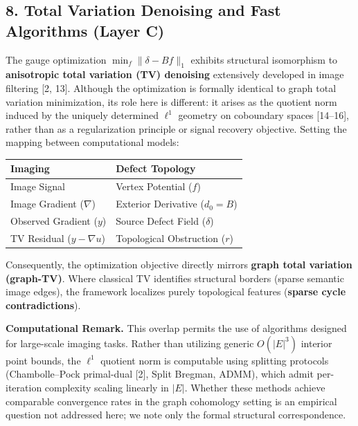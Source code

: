 \documentclass[
]{article}
\begin{document}
\subsection{\texorpdfstring{8. Total Variation Denoising and Fast
Algorithms \textbf{(Layer
C)}}{8. Total Variation Denoising and Fast Algorithms (Layer C)}}\label{total-variation-denoising-and-fast-algorithms-layer-c}

The gauge optimization \(\min_f \|\delta - B f\|_1\) exhibits structural
isomorphism to \textbf{anisotropic total variation (TV) denoising}
extensively developed in image filtering {[}2, 13{]}. Although the
optimization is formally identical to graph total variation
minimization, its role here is different: it arises as the quotient norm
induced by the uniquely determined \(\ell^1\) geometry on coboundary
spaces {[}14--16{]}, rather than as a regularization principle or signal
recovery objective. Setting the mapping between computational models:

\begin{longtable}[]{@{}ll@{}}
\toprule\noalign{}
Imaging & Defect Topology \\
\midrule\noalign{}
\endhead
\bottomrule\noalign{}
\endlastfoot
Image Signal & Vertex Potential (\(f\)) \\
Image Gradient (\(\nabla\)) & Exterior Derivative (\(d_0 = B\)) \\
Observed Gradient (\(y\)) & Source Defect Field (\(\delta\)) \\
TV Residual (\(y - \nabla u\)) & Topological Obstruction (\(r\)) \\
\end{longtable}

Consequently, the optimization objective directly mirrors \textbf{graph
total variation (graph-TV)}. Where classical TV identifies structural
borders (sparse semantic image edges), the framework localizes purely
topological features (\textbf{sparse cycle contradictions}).

\textbf{Computational Remark.} This overlap permits the use of
algorithms designed for large-scale imaging tasks. Rather than utilizing
generic \(O(|E|^3)\) interior point bounds, the \(\ell^1\) quotient norm
is computable using splitting protocols (Chambolle--Pock primal-dual
{[}2{]}, Split Bregman, ADMM), which admit per-iteration complexity
scaling linearly in \(|E|\). Whether these methods achieve comparable
convergence rates in the graph cohomology setting is an empirical
question not addressed here; we note only the formal structural
correspondence.
\end{document}
